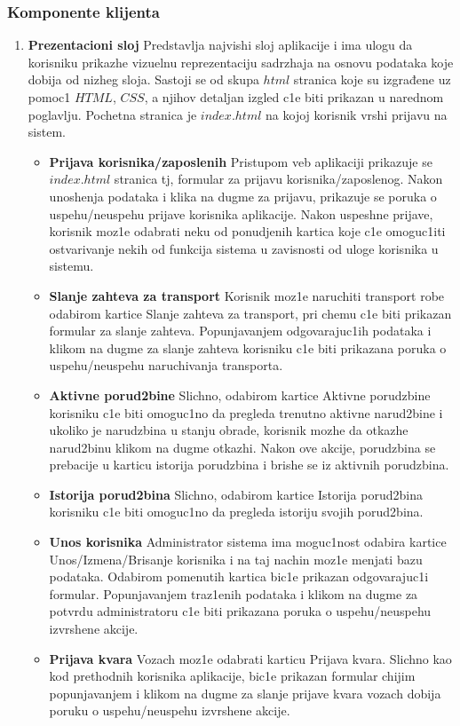 \subsubsection{Komponente klijenta}
\begin{enumerate}
    \item \textbf{Prezentacioni sloj}
    Predstavlja najvishi sloj aplikacije i ima ulogu da korisniku
prikazhe vizuelnu reprezentaciju sadrzhaja na osnovu podataka koje dobija od nizheg
sloja. Sastoji se od skupa $html$ stranica koje su izgrađene uz pomoc1 $HTML$, $CSS$, a njihov detaljan izgled c1e biti prikazan u narednom poglavlju. Pochetna stranica je $index.html$ na kojoj korisnik vrshi prijavu na sistem. \\
\begin{itemize}
\item{\textbf{Prijava korisnika/zaposlenih}
Pristupom veb aplikaciji prikazuje se $index.html$ stranica tj, formular za prijavu korisnika/zaposlenog. Nakon unoshenja podataka i klika na dugme za prijavu, prikazuje se poruka o uspehu/neuspehu prijave korisnika aplikacije. Nakon uspeshne prijave, korisnik moz1e odabrati neku od ponudjenih kartica koje c1e omoguc1iti ostvarivanje nekih od funkcija sistema u zavisnosti od uloge korisnika u sistemu.}
\item{\textbf{Slanje zahteva za transport}
Korisnik moz1e naruchiti transport robe odabirom kartice Slanje zahteva za transport, pri chemu c1e biti prikazan formular za slanje zahteva. Popunjavanjem odgovarajuc1ih podataka i klikom na dugme za slanje zahteva korisniku c1e biti prikazana poruka o uspehu/neuspehu naruchivanja transporta.}
\item{\textbf{Aktivne porud2bine}
Slichno, odabirom kartice Aktivne porudzbine korisniku c1e biti omoguc1no da pregleda trenutno aktivne narud2bine i ukoliko je narudzbina u stanju obrade, korisnik mozhe da otkazhe narud2binu klikom na dugme otkazhi. Nakon ove akcije, porudzbina se prebacije u karticu istorija porudzbina i brishe se iz aktivnih porudzbina.
}
\item{\textbf{Istorija porud2bina}
Slichno, odabirom kartice Istorija porud2bina korisniku c1e biti omoguc1no da pregleda istoriju svojih porud2bina.
}

\item{\textbf{Unos korisnika}
Administrator sistema ima moguc1nost odabira kartice Unos/Izmena/Brisanje korisnika i na taj nachin moz1e menjati bazu podataka. Odabirom pomenutih kartica bic1e prikazan odgovarajuc1i formular. Popunjavanjem traz1enih podataka i klikom na dugme za potvrdu administratoru c1e biti prikazana poruka o uspehu/neuspehu izvrshene akcije.}
\item{\textbf{Prijava kvara}
Vozach moz1e odabrati karticu Prijava kvara. Slichno kao kod prethodnih korisnika aplikacije, bic1e prikazan formular chijim popunjavanjem i klikom na dugme za slanje prijave kvara vozach dobija poruku o uspehu/neuspehu izvrshene akcije.}


\end{itemize}
\end{enumerate}
